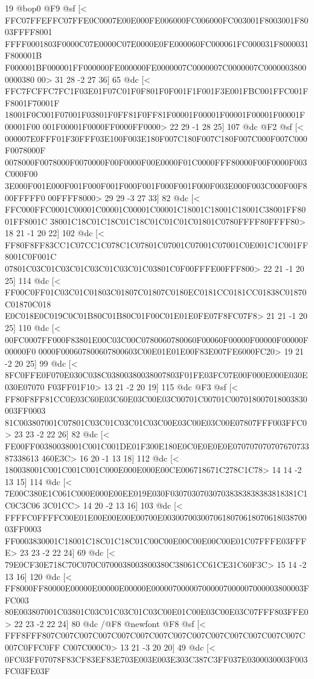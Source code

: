 {{{{{{{{{{{{{{{{{{{{{{{{{{{{{{{{{{{{{{{{{{{{{{{{{{{{{{{{{{{{{{{{{{{{{{{{{{{{{{{{{{{{{{{{{{{{{{{{{{{{{19 @bop0
@F9 @sf
[<
FFC07FFEFFC07FFE0C0007E00E000FE006000FC006000FC003001F8003001F8003FFFF8001
FFFF0001803F0000C07E0000C07E0000E0FE000060FC000061FC000031F8000031F800001B
F000001BF000001FF000000FE000000FE0000007C0000007C0000007C00000038000000380
00>
	 31 28 -2 27 36] 65 @dc
[<
FFC7FCFFC7FC1F03E01F07C01F0F801F0F001F1F001F3E001FBC001FFC001FF8001F70001F
18001F0C001F07001F03801F0FF81F0FF81F00001F00001F00001F00001F00001F00001F00
001F00001F0000FF0000FF0000>
	 22 29 -1 28 25] 107 @dc
@F2 @sf
[<
000007E0FFF01F30FFF03E100F003E180F007C180F007C180F007C000F007C000F0078000F
0078000F0078000F0070000F00F0000F00E0000F01C0000FFF80000F00F0000F003C000F00
3E000F001E000F001F000F001F000F001F000F001F000F003E000F003C000F00F800FFFFF0
00FFFF8000>
	 29 29 -3 27 33] 82 @dc
[<
FFC000FFC0001C00001C00001C00001C00001C18001C18001C18001C38001FF8001FF8001C
38001C18C01C18C01C18C01C01C01C01801C0780FFFF80FFFF80>
	 18 21 -1 20 22] 102 @dc
[<
FF80F8FF83CC1C07CC1C078C1C07801C07001C07001C07001C0E001C1C001FF8001C0F001C
07801C03C01C03C01C03C01C03C01C03801C0F00FFFE00FFF800>
	 22 21 -1 20 25] 114 @dc
[<
FF00C0FF01C03C01C01803C01807C01807C0180EC0181CC0181CC01838C01870C01870C018
E0C018E0C019C0C01B80C01B80C01F00C01E01E0FE07F8FC07F8>
	 21 21 -1 20 25] 110 @dc
[<
00FC0007FF000F83801E00C03C00C0780060780060F00060F00000F00000F00000F00000F0
0000F000607800607800603C00E01E01E00F83E007FE6000FC20>
	 19 21 -2 20 25] 99 @dc
[<
8FC0FFE0F070E030C038C03800380038007803F01FE03FC07E00F000E000E030E030E07070
F03FF01F10>
	 13 21 -2 20 19] 115 @dc
@F3 @sf
[<
FF80F8FF81CC0E03C60E03C60E03C00E03C00701C00701C007018007018003830003FF0003
81C003807001C07801C03C01C03C01C03C00E03C00E03C00E07807FFF003FFC0>
	 23 23 -2 22 26] 82 @dc
[<
FE00FF00380038001C001C001DE01F300E180E0C0E0E0E0E07070707070767073387338613
460E3C>
	 16 20 -1 13 18] 112 @dc
[<
180038001C001C001C001C000E000E000E00CE006718671C278C1C78>
	 14 14 -2 13 15] 114 @dc
[<
7E00C380E1C061C000E000E00EE019E030F030703070307038383838383818381C1C0C3C06
3C01CC>
	 14 20 -2 13 16] 103 @dc
[<
FFFFC0FFFFC00E01E00E00E00E00700E003007003007061807061807061803870003FF0003
FF0003830001C18001C18C01C18C01C00C00E00C00E00C00E01C07FFFE03FFFE>
	 23 23 -2 22 24] 69 @dc
[<
79E0CF30E718C70C070C0700038003800380C38061CC61CE31C60F3C>
	 15 14 -2 13 16] 120 @dc
[<
FF8000FF80000E00000E00000E00000E000007000007000007000007000003800003FFC003
80E003807001C03801C03C01C03C01C03C00E01C00E03C00E03C07FFF803FFE0>
	 22 23 -2 22 24] 80 @dc
/@F8 @newfont
@F8 @sf
[<
FFF8FFF807C007C007C007C007C007C007C007C007C007C007C007C007C007C007C0FFC0FF
C007C000C0>
	 13 21 -3 20 20] 49 @dc
[<
0FC03FF07078F83CF83EF83E703E003E003E303C387C3FF037E0300030003F003FC03FE03F
}}}}}}}}}}}}}}}}}}}}}}}}}}}}}}}}}}}}}}}}}}}}}}}}}}}}}}}}}}}}}}}}}}}}}}}}}}}}}}}}}}}}}}}}}}}}}}}}}}}}}
